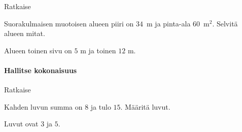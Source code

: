\begin{tehtavasivu}
\begin{tehtava}
    Ratkaise
    \begin{alakohdat}
    \end{alakohdat}
    \begin{vastaus}
        \begin{alakohdat}
        \end{alakohdat}
    \end{vastaus}
\end{tehtava}

\begin{tehtava}
    Suorakulmaisen muotoisen alueen piiri on $34$~m ja pinta-ala $60$~m$^2$. Selvitä alueen mitat.
    \begin{vastaus}
		Alueen toinen sivu on $5$ m ja toinen $12$ m.
    \end{vastaus}
\end{tehtava}

\paragraph*{Hallitse kokonaisuus}

\begin{tehtava}
    Ratkaise
    \begin{alakohdat}
    \end{alakohdat}
    \begin{vastaus}
        \begin{alakohdat}
        \end{alakohdat}
    \end{vastaus}
\end{tehtava}

\begin{tehtava}
    Kahden luvun summa on $8$ ja tulo $15$. Määritä luvut.
    \begin{vastaus}
		Luvut ovat $3$ ja $5$.
    \end{vastaus}
\end{tehtava}


\end{tehtavasivu}

